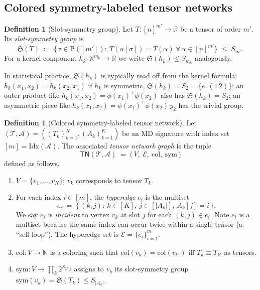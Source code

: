 \documentclass[11pt]{article}
\newcommand{\bbR}{\mathbb{R}}
\newcommand{\bbX}{\mathbb{X}}
\newcommand{\bbN}{\mathbb{N}}
\newcommand{\calA}{\mathcal{A}}
\newcommand{\calT}{\mathcal{T}}
\newcommand{\calE}{\mathcal{E}}
\newcommand{\TN}{\mathsf{TN}}
\newcommand{\Sym}{\mathfrak{S}}
\newcommand{\indexset}{\mathrm{Idx}}
\theoremstyle{plain}
\theoremstyle{definition}
\newtheorem{definition}[theorem]{Definition}
\begin{document}
\subsection{Colored symmetry-labeled tensor networks}

\begin{definition}[Slot-symmetry group]
\label{def:slot-sym}
Let $T:[n]^{m'}\to\bbR$ be a tensor of order $m'$.  Its
\emph{slot-symmetry group} is
\[
   \Sym(T) \;\coloneqq\; \{\sigma\in\mathrm{P}([m']):\
   T(\alpha[\sigma])=T(\alpha)\ \forall\,\alpha\in[n]^{m'}\} \;\le\; S_{m'}.
\]
For a kernel component $h_k:\bbX^{m_k}\to\bbR$ we write
$\Sym(h_k)\le S_{m_k}$ analogously.
\end{definition}

In statistical practice, $\Sym(h_k)$ is typically read off from the kernel
formula: $h_k(x_1,x_2)=h_k(x_2,x_1)$ if $h_k$ is symmetric,
$\Sym(h_k)=S_2=\{e,(1\,2)\}$; an outer product like
$h_k(x_1,x_2)=\phi(x_1)^\top \phi(x_2)$ also has $\Sym(h_k)=S_2$; an
asymmetric piece like $h_k(x_1,x_2)=\phi(x_1)^\top \phi(x_2)\,y_2$ has the
trivial group.

\begin{definition}[Colored symmetry-labeled tensor network]
\label{def:tn}
Let $(\calT,\calA)=((T_k)_{k=1}^K,(A_k)_{k=1}^K)$ be an MD signature with
index set $[m]=\indexset(\calA)$.  The associated
\emph{tensor network graph} is the tuple
\[
   \TN(\calT,\calA) \;=\; \bigl(\,V,\ \calE,\ \mathrm{col},\ \mathrm{sym}\,\bigr)
\]
defined as follows.
\begin{enumerate}[label=\textup{(\arabic*)},leftmargin=2em]
\item $V=\{v_1,\dots,v_K\}$; $v_k$ corresponds to tensor $T_k$.
\item For each index $i\in[m]$, the \emph{hyperedge} $e_i$ is the multiset
\[
   e_i \;=\; \bigl\{\,(k,j):\ k\in[K],\ j\in[|A_k|],\ A_k[j]=i\,\bigr\}.
\]
We say $e_i$ is \emph{incident} to vertex $v_k$ at slot $j$ for each
$(k,j)\in e_i$.  Note $e_i$ is a multiset because the same index can occur
twice within a single tensor (a ``self-loop'').
The hyperedge set is $\calE=\{e_i\}_{i=1}^m$.
\item $\mathrm{col}:V\to\bbN$ is a coloring such that
$\mathrm{col}(v_k)=\mathrm{col}(v_{k'})$ iff $T_k\equiv T_{k'}$ as tensors.
\item $\mathrm{sym}:V\to \prod_k 2^{S_{|A_k|}}$ assigns to $v_k$ its
slot-symmetry group $\mathrm{sym}(v_k)=\Sym(T_k)\le S_{|A_k|}$.
\end{enumerate}
\end{definition}
\end{document}
